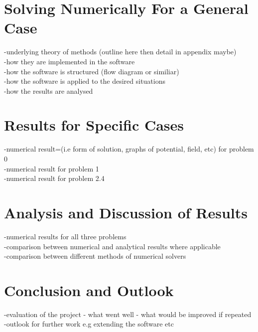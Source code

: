 \documentclass{article}
\begin{document}
\section{Solving Numerically For a General Case}
-underlying theory of methods (outline here then detail in appendix maybe) \\
-how they are implemented in the software \\
-how the software is structured (flow diagram or similiar) \\
-how the software is applied to the desired situations \\
-how the results are analysed \\

\section{Results for Specific Cases}
-numerical result=(i.e form of solution, graphs of potential, field, etc) for problem 0 \\
-numerical result for problem 1\\
-numerical result for problem 2.4 \\ 

\section{Analysis and Discussion of Results}
-numerical results for all three problems\\
-comparison between numerical and analytical results where applicable\\
-comparison between different methods of numerical solvers\\

\section{Conclusion and Outlook}
-evaluation of the project - what went well - what would be improved if repeated\\
-outlook for further work e.g extending the software etc \\
\end{document}
